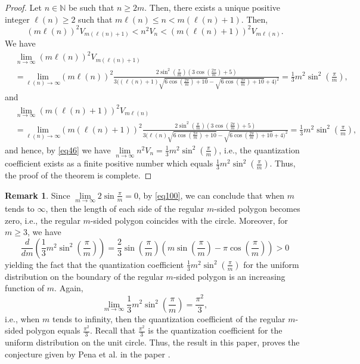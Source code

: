 \documentclass[12pt]{amsart}
\theoremstyle{plain}
\theoremstyle{definition}
\newtheorem{remark}[subsection]{Remark}
\newcommand{\D}[1]{\mathbb{#1}}%
\begin{document}
\begin{proof} Let $n\in \D N$ be such that $n\geq 2m$. Then, there exists a unique positive integer $\ell(n)\geq 2$ such that $m\ell(n)\leq n<m(\ell(n)+1)$. Then,
\begin{equation} \label{eq46} (m\ell(n))^2V_{m(\ell(n)+1)}<n^2 V_n<(m(\ell(n)+1))^2V_{m\ell(n)}.
\end{equation}
We have
\begin{align*}
&\lim_{n \to \infty} (m\ell(n))^2V_{m(\ell(n)+1)}\\
&=\underset{\ell(n)\to \infty }{\text{lim}}(m \ell(n))^2 \frac{2 \sin ^2(\frac{\pi }{m}) (3 \cos (\frac{2 \pi }{m})+5)}{3 \Big((\ell(n)+1) \sqrt{6 \cos (\frac{2 \pi }{m})+10}-\sqrt{6 \cos (\frac{2 \pi }{m})+10}+4\Big)^2}=\frac{1}{3} m^2 \sin ^2(\frac{\pi }{m}),\end{align*}
and
\begin{align*}
&\lim_{n \to \infty} (m(\ell(n)+1))^2V_{m\ell(n)}\\
&=\underset{\ell(n)\to \infty }{\text{lim}}(m(\ell(n)+1))^2\frac{2 \sin ^2(\frac{\pi }{m}) (3 \cos (\frac{2 \pi }{m})+5)}{3 \Big(\ell(n) \sqrt{6 \cos (\frac{2 \pi }{m})+10}-\sqrt{6 \cos (\frac{2 \pi }{m})+10}+4\Big)^2}=\frac{1}{3} m^2 \sin ^2(\frac{\pi }{m}),
\end{align*}
and hence, by \eqref{eq46} we have
$\mathop{\lim}\limits_{n\to\infty} n^2 V_n=\frac{1}{3} m^2 \sin ^2(\frac{\pi }{m})$, i.e., the quantization coefficient exists as a finite positive number which equals $\frac{1}{3} m^2 \sin ^2(\frac{\pi }{m})$.
Thus, the proof of the theorem is complete.
\end{proof}

\begin{remark} Since  $\lim\limits_{m\to \infty}2 \sin \frac{\pi }{m}=0$, by \eqref{eq100}, we can conclude that when $m$ tends to $\infty$, then the length of each side of the regular $m$-sided polygon becomes zero, i.e., the regular $m$-sided polygon coincides with the circle. Moreover, for $m\geq 3$, we have
 \[\frac{d}{dm}(\frac{1}{3} m^2 \sin ^2(\frac{\pi }{m}))=\frac{2}{3} \sin (\frac{\pi }{m}) (m \sin (\frac{\pi }{m})-\pi  \cos (\frac{\pi }{m}))>0\]
yielding the fact that the quantization coefficient $\frac{1}{3} m^2 \sin ^2(\frac{\pi }{m})$ for the uniform distribution on the boundary of the regular $m$-sided polygon is an increasing function of $m$. Again,
 \[\lim_{m\to\infty}\frac{1}{3} m^2 \sin ^2(\frac{\pi }{m})=\frac{\pi ^2}{3},\]
 i.e., when $m$ tends to infinity, then the quantization coefficient of the regular $m$-sided polygon equals $\frac{\pi ^2}{3}$.
 Recall that $\frac{\pi ^2}{3}$ is the quantization coefficient for the uniform distribution on the unit circle. Thus, the result in this paper, proves the conjecture given by Pena et al. in the paper \cite{PRRSS}.
 \end{remark}
\end{document}
